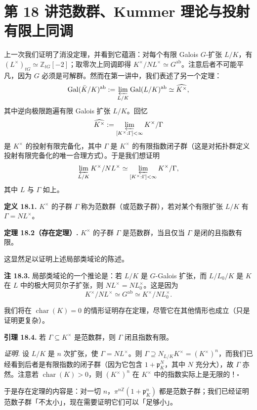 \section*{第 18 讲\quad 范数群、Kummer 理论与投射有限上同调}

上一次我们证明了消没定理，并看到它蕴涵：对每个有限 Galois $G$-扩张 $L/K$，有 $(L^\times)_{tG}\simeq \mathbb Z_{tG}[-2]$；取零次上同调即得 $K^\times/NL^\times\simeq G^{\mathrm{ab}}$。注意后者不可能平凡，因为 $G$ 必须是可解群。然而在第一讲中，我们表述了另一个定理：
\[
\operatorname{Gal}(\bar K/K)^{\mathrm{ab}}:=\varprojlim_{L/K}\operatorname{Gal}(L/K)^{\mathrm{ab}}\simeq \widehat{K^\times},
\]
其中逆向极限跑遍有限 Galois 扩张 $L/K$。回忆
\[
\widehat{K^\times}:=\varprojlim_{[K^\times:\Gamma]<\infty}K^\times/\Gamma
\]
是 $K^\times$ 的投射有限完备化，其中 $\Gamma$ 是 $K^\times$ 的有限指数闭子群（这是对拓扑群定义投射有限完备化的唯一合理方式）。于是我们想证明
\[
\varprojlim_{L/K}K^\times/NL^\times\simeq \varprojlim_{[K^\times:\Gamma]<\infty}K^\times/\Gamma,
\]
其中 $L$ 与 $\Gamma$ 如上。

\textbf{定义 18.1.} $K^\times$ 的子群 $\Gamma$ 称为范数群（或范数子群），若对某个有限扩张 $L/K$ 有 $\Gamma=NL^\times$。

\textbf{定理 18.2（存在定理）.} $K^\times$ 的子群 $\Gamma$ 是范数群，当且仅当 $\Gamma$ 是闭的且指数有限。

这显然足以证明上述局部类域论的陈述。

\textbf{注 18.3.} 局部类域论的一个推论是：若 $L/K$ 是 $G$-Galois 扩张，而 $L/L_0/K$ 是 $K$ 在 $L$ 中的极大阿贝尔子扩张，则 $NL^\times=NL_0^\times$。这是因为
\[
K^\times/NL^\times\simeq G^{\mathrm{ab}}\simeq K^\times/NL_0^\times.
\]

我们将在 $\operatorname{char}(K)=0$ 的情形证明存在定理，尽管它在其他情形也成立（只是证明更复杂）。

\textbf{引理 18.4.} 若 $\Gamma\subseteq K^\times$ 是范数群，则 $\Gamma$ 闭且指数有限。

\textit{证明.} 设 $L/K$ 是 $n$ 次扩张，使 $\Gamma=NL^\times$。则 $\Gamma\supseteq N_{L/K}K^\times=(K^\times)^n$，而我们已经看到后者是有限指数的闭子群（因为它包含 $1+\mathfrak p_K^N$，其中 $N$ 充分大），故 $\Gamma$ 亦然。注意若 $\operatorname{char}(K)>0$，则 $(K^\times)^n$ 在 $K^\times$ 中的指数实际上是无限的！\hfill$\square$

于是存在定理的内容是：对一切 $n$，$\pi^{n\mathbb Z}(1+\mathfrak p_K^n)$ 都是范数子群；我们已经证明范数子群「不太小」，现在需要证明它们可以「足够小」。

